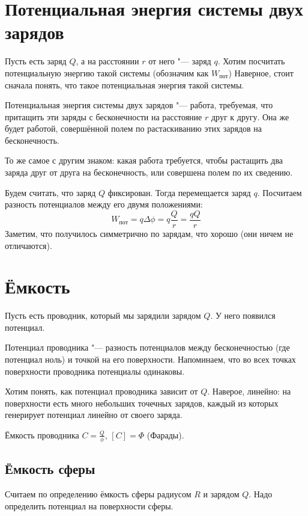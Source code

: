 \section{Потенциальная энергия системы двух зарядов}
	Пусть есть заряд $Q$, а на расстоянии $r$ от него "--- заряд $q$.
	Хотим посчитать потенциальную энергию такой системы (обозначим как $W_{пот}$)
	Наверное, стоит сначала понять, что такое потенциальная энергия такой системы.
	\begin{Def}
		Потенциальная энергия системы двух зарядов "--- работа, требуемая, что притащить
		эти заряды с бесконечности на расстояние $r$ друг к другу.
		Она же будет работой, совершённой полем по растаскиванию этих зарядов на бесконечность.
	\end{Def}
	\begin{Rem}
		То же самое с другим знаком: какая работа требуется, чтобы растащить два заряда друг от друга на бесконечность, или совершена полем по их сведению.
	\end{Rem}
	Будем считать, что заряд $Q$ фиксирован.
	Тогда перемещается заряд $q$.
	Посчитаем разность потенциалов между его двумя положениями:
	\[W_{пот} = q \Delta \phi = q \frac{Q} r = \frac{qQ}{r}\]
	Заметим, что получилось симметрично по зарядам, что хорошо (они ничем не отличаются).

\section{Ёмкость}
	Пусть есть проводник, который мы зарядили зарядом $Q$.
	У него появился потенциал.
	\begin{Def}
		Потенциал проводника "--- разность потенциалов между бесконечностью (где потенциал ноль) и точкой на его поверхности.
		Напоминаем, что во всех точках поверхности проводника потенциалы одинаковы.
	\end{Def}
	Хотим понять, как потенциал проводника зависит от $Q$.
	Наверое, линейно: на поверхности есть много небольших точечных зарядов, каждый из которых генерирует потенциал линейно от своего заряда.
	\begin{Def}
		Ёмкость проводника $C=\frac{Q}{\phi}$, $[C]=\Phi$ (Фарады).
	\end{Def}

	\subsection{Ёмкость сферы}
		Считаем по определению ёмкость сферы радиусом $R$ и зарядом $Q$.
		Надо определить потенциал на поверхности сферы.
